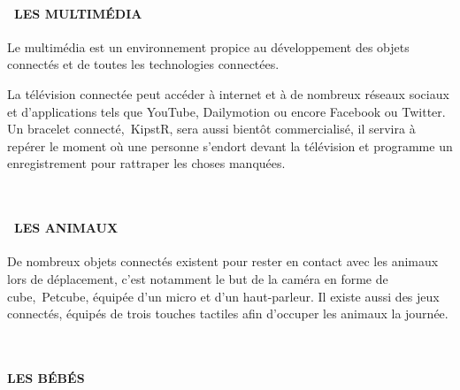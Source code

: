 \documentclass[12pt,a4paper]{report}
\begin{document}
\noindent 
\paragraph{~LES MULTIM\'{E}DIA}

\noindent \begin{flushleft}
	Le multim\'{e}dia est un environnement propice au d\'{e}veloppement des objets connect\'{e}s et de toutes les technologies connect\'{e}es.
	
	\noindent La t\'{e}l\'{e}vision connect\'{e}e peut acc\'{e}der \`{a} internet et \`{a} de nombreux r\'{e}seaux sociaux et d'applications tels que YouTube, Dailymotion ou encore Facebook ou Twitter. Un bracelet connect\'{e},~KipstR, sera aussi bient\^{o}t commercialis\'{e}, il servira \`{a} rep\'{e}rer le moment o\`{u} une personne s'endort devant la t\'{e}l\'{e}vision et programme un enregistrement pour rattraper les choses manqu\'{e}es.
	
	\noindent ~
\end{flushleft}

\noindent 
\paragraph{~LES ANIMAUX}

\noindent \begin{flushleft}
	De nombreux objets connect\'{e}s existent pour rester en contact avec les animaux lors de d\'{e}placement, c'est notamment le but de la cam\'{e}ra en forme de cube,~Petcube, \'{e}quip\'{e}e d'un micro et d'un haut-parleur. Il existe aussi des jeux connect\'{e}s, \'{e}quip\'{e}s de trois touches tactiles afin d'occuper les animaux la journ\'{e}e.
	
	\noindent ~
\end{flushleft}

\noindent 
\paragraph{LES B\'{E}B\'{E}S}
\end{document}
